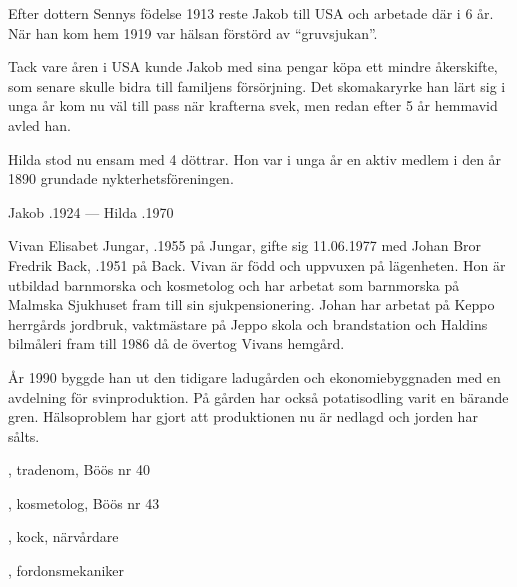 Efter dottern Sennys födelse 1913 reste Jakob till USA och arbetade där i 6 år. När han kom hem 1919 var hälsan förstörd av ``gruvsjukan''.

Tack vare åren i USA kunde Jakob med sina pengar köpa ett mindre åkerskifte, som senare skulle bidra till familjens försörjning. Det skomakaryrke han lärt sig i unga år kom nu väl till pass när krafterna svek, men redan efter 5 år hemmavid avled han.

Hilda stod nu ensam med 4 döttrar. Hon var i unga år en aktiv medlem i den år 1890 grundade nykterhetsföreningen.
\begin{jhchildren}
  \item {}
  \item {}
  \item {}
  \item {}
  \item {}
\end{jhchildren}

Jakob .1924  ---  Hilda .1970






Vivan Elisabet Jungar, .1955 på Jungar, gifte sig 11.06.1977 med Johan Bror Fredrik Back, .1951 på Back. Vivan är född och uppvuxen på lägenheten. Hon är utbildad barnmorska och kosmetolog och har arbetat som barnmorska på Malmska Sjukhuset fram till sin sjukpensionering. Johan har arbetat på Keppo herrgårds jordbruk, vaktmästare på Jeppo skola och brandstation och Haldins bilmåleri fram till 1986 då de övertog Vivans hemgård.

År 1990 byggde han ut den tidigare ladugården och ekonomiebyggnaden med en avdelning för svinproduktion. På gården har också potatisodling varit en bärande gren. Hälsoproblem har gjort att produktionen nu är nedlagd och jorden har sålts.
\begin{jhchildren}
  \item {}, tradenom, Böös nr 40
  \item {}, kosmetolog, Böös nr 43
  \item {}, kock, närvårdare
  \item {}, fordonsmekaniker
\end{jhchildren}


